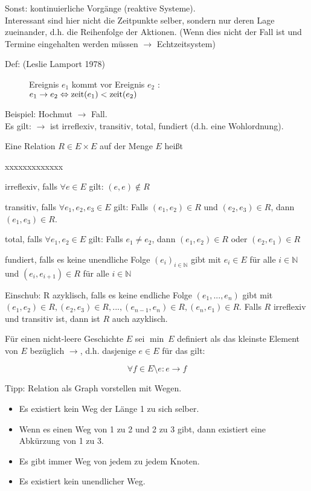 Sonst: kontinuierliche Vorgänge (reaktive Systeme).\\
Interessant sind hier nicht die Zeitpunkte selber, sondern nur deren Lage zueinander, d.h. die Reihenfolge der Aktionen. (Wenn dies nicht der Fall ist und Termine eingehalten werden müssen $ \rightarrow $ Echtzeitsystem)

\begin{description}
	\item[Def: (Leslie Lamport 1978)] Ereignis $ e_1 $ kommt vor Ereignis $ e_2 $ :\\
	$ e_1 \rightarrow e_2 \Leftrightarrow \operatorname{zeit}(e_1) < \operatorname{zeit}(e_2) $
\end{description}

Beispiel: Hochmut  $ \rightarrow $ Fall.\\
Es gilt: $ \rightarrow $ ist irreflexiv, transitiv, total, fundiert (d.h. eine Wohlordnung).

Eine Relation $ R \in E \times E $ auf der Menge $ E $ heißt
\begin{labeling}{xxxxxxxxxxxxx}
	\item[irreflexiv,] falls $ \forall e \in E $ gilt: $ (e, e) \notin  R $
	\item[transitiv,] falls $ \forall e_1, e_2, e_3 \in E $ gilt: Falls $ (e_1, e_2) \in R $ und $ (e_2, e_3) \in R $, dann $ (e_1, e_3) \in R $.
	\item[total,] falls $ \forall e_1, e_2 \in E $ gilt: Falls $ e_1 \neq e_2 $, dann $(e_1, e_2) \in R $ oder $ (e_2, e_1) \in R $
	\item[fundiert,] falls es keine unendliche Folge $ (e_i)_{i \in \mathbb{N}} $ gibt mit $ e_i \in E $ für alle $ i \in \mathbb{N} $ und $ (e_i, e_{i + 1}) \in R $ für alle $ i \in \mathbb{N} $
\end{labeling}

Einschub: R azyklisch, falls es keine endliche Folge $ (e_1, ..., e_n) $ gibt mit $ (e_1, e_2) \in R, (e_2, e_3) \in R, ..., (e_{n - 1}, e_n) \in R, (e_n, e_1) \in R $.
Falls $ R $ irreflexiv und transitiv ist, dann ist $ R $ auch azyklisch.

Für einen nicht-leere Geschichte $ E $ sei $ \min \ E $ definiert als das kleinste Element von $ E $ bezüglich $ \rightarrow $, d.h. dasjenige $ e \in E $ für das gilt:

\begin{equation*}
	\forall f \in E\setminus{e}: e \rightarrow f
\end{equation*}

Tipp: Relation als Graph vorstellen mit Wegen.
\begin{itemize}
	\item Es existiert kein Weg der Länge 1 zu sich selber.
	\item Wenn es einen Weg von 1 zu 2 und 2 zu 3 gibt, dann existiert eine Abkürzung von 1 zu 3.
	\item Es gibt immer Weg von jedem zu jedem Knoten.
	\item Es existiert kein unendlicher Weg.
\end{itemize}

